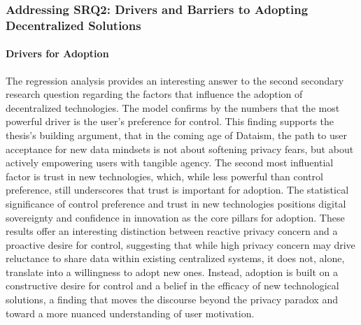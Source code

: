 	\subsubsection{Addressing SRQ2: Drivers and Barriers to Adopting Decentralized Solutions}

	\paragraph{Drivers for Adoption}
	The regression analysis provides an interesting answer to the second secondary research question regarding the factors that influence the adoption of decentralized technologies. The model confirms by the numbers that the most powerful driver is the user's preference for control. This finding supports the thesis's building argument, that in the coming age of Dataism, the path to user acceptance for new data mindsets is not about softening privacy fears, but about actively empowering users with tangible agency. The second most influential factor is trust in new technologies, which, while less powerful than control preference, still underscores that trust is important for adoption. The statistical significance of control preference and trust in new technologies positions digital sovereignty and confidence in innovation as the core pillars for adoption. These results offer an interesting distinction between reactive privacy concern and a proactive desire for control, suggesting that while high privacy concern may drive reluctance to share data within existing centralized systems, it does not, alone, translate into a willingness to adopt new ones. Instead, adoption is built on a constructive desire for control and a belief in the efficacy of new technological solutions, a finding that moves the discourse beyond the privacy paradox and toward a more nuanced understanding of user motivation.

